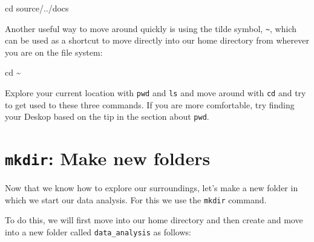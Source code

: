 \documentclass[
  letterpaper,
  DIV=11,
  numbers=noendperiod]{scrreprt}
\newenvironment{Shaded}{}{}
\newcommand{\BuiltInTok}[1]{\textcolor[rgb]{0.84,0.23,0.29}{#1}}
\newcommand{\NormalTok}[1]{\textcolor[rgb]{0.14,0.16,0.18}{#1}}
\begin{document}
\begin{Shaded}
\begin{Highlighting}[]
\BuiltInTok{cd}\NormalTok{ source/../docs}
\end{Highlighting}
\end{Shaded}

Another useful way to move around quickly is using the tilde symbol,
\texttt{\textasciitilde{}}, which can be used as a shortcut to move
directly into our home directory from wherever you are on the file
system:

\begin{Shaded}
\begin{Highlighting}[]
\BuiltInTok{cd}\NormalTok{ \textasciitilde{}}
\end{Highlighting}
\end{Shaded}

\begin{tcolorbox}[enhanced jigsaw, breakable, left=2mm, opacitybacktitle=0.6, coltitle=black, toprule=.15mm, colframe=quarto-callout-caution-color-frame, opacityback=0, bottomtitle=1mm, rightrule=.15mm, colback=white, toptitle=1mm, leftrule=.75mm, titlerule=0mm, bottomrule=.15mm, title=\textcolor{quarto-callout-caution-color}{\faFire}\hspace{0.5em}{Exercise}, colbacktitle=quarto-callout-caution-color!10!white, arc=.35mm]

Explore your current location with \texttt{pwd} and \texttt{ls} and move
around with \texttt{cd} and try to get used to these three commands. If
you are more comfortable, try finding your Deskop based on the tip in
the section about \texttt{pwd}.

\end{tcolorbox}

\section{\texorpdfstring{\texttt{mkdir}: Make new
folders}{mkdir: Make new folders}}\label{mkdir-make-new-folders}

Now that we know how to explore our surroundings, let's make a new
folder in which we start our data analysis. For this we use the
\texttt{mkdir} command.

To do this, we will first move into our home directory and then create
and move into a new folder called \texttt{data\_analysis} as follows:
\end{document}
